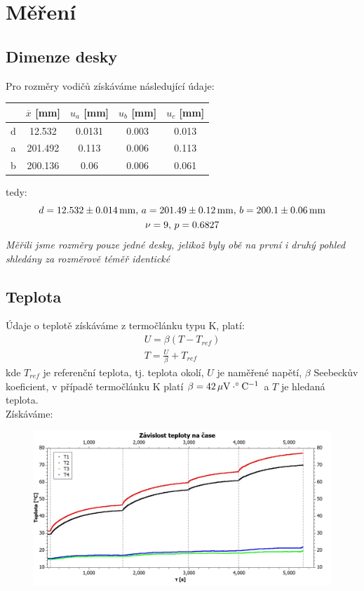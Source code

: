 \documentclass[czech,11pt,a4paper]{article}
\begin{document}
	\section{Měření}
	\subsection{Dimenze desky}
	Pro rozměry vodičů získáváme následující údaje:
	
	\begin{center}
		\begin{tabular}{|c|c|c|c|c|}
		\hline
		&$\overline x$ [mm] & $u_a$ [mm] & $u_b$ [mm] & $u_c$ [mm] \\
		\hline
		d & 12.532 & 0.0131 & 0.003 & 0.013 \\
		\hline
		a & 201.492 & 0.113 & 0.006 & 0.113 \\
		\hline
		b & 200.136 & 0.06 & 0.006 & 0.061 \\
		\hline
	\end{tabular}
	\end{center}
	tedy:
	\begin{gather*}
		d = 12.532 \pm 0.014 \, \text{mm}, \, a = 201.49 \pm 0.12 \, \text{mm}, \, b = 200.1 \pm 0.06 \,\rm mm \\
		\nu = 9, \, p = 0.6827 
	\end{gather*}
\textit{Měřili jsme rozměry pouze jedné desky, jelikož byly obě na první i druhý pohled shledány za rozměrově téměř identické}
   \subsection{Teplota}
   Údaje o teplotě získáváme z termočlánku typu K, platí:
   \begin{gather}
   	U = \beta (T - T_{ref}) \\
   	T = \frac U \beta + T_{ref}
   \end{gather}
   kde $T_{ref}$ je referenční teplota, tj. teplota okolí, $U$ je naměřené napětí, $\beta$ Seebeckův koeficient, v případě termočlánku K platí $\beta = 42  \, \rm \mu V \cdot ^\circ C ^{-1}$  a $T$ je hledaná teplota. \\

   Získáváme:
   	
   \begin{figure}[H]
   	\begin{center}
   		
   	\includegraphics[width = 1\textwidth, ]{zavislost}
   	\end{center}
   \end{figure}
   
\end{document}
